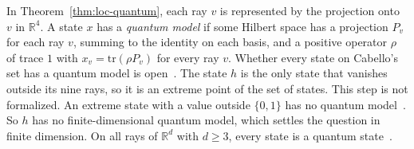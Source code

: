 In Theorem~\ref{thm:loc-quantum}, each ray $v$ is represented by the
projection onto $v$ in $\mathbb{R}^4$. A state $x$ has a \emph{quantum
model} if some Hilbert space has a projection $P_v$ for each ray $v$,
summing to the identity on each basis, and a positive operator
$\rho$ of trace $1$ with $x_v = \mathrm{tr}(\rho P_v)$ for every ray $v$.
Whether every state on Cabello's set has a quantum model is
open~\cite{acin2015}. The state $h$ is the only state that
vanishes outside its nine rays, so it is an extreme point of the set of
states. This step is not formalized. An extreme state with a value outside
$\{0,1\}$ has no quantum model~\cite{sujan-kunjwal2025}. So $h$ has no
finite-dimensional quantum model, which settles the question in finite
dimension. On all rays of $\mathbb{R}^d$
with $d \ge 3$, every state is a quantum state~\cite{gleason1957}.

